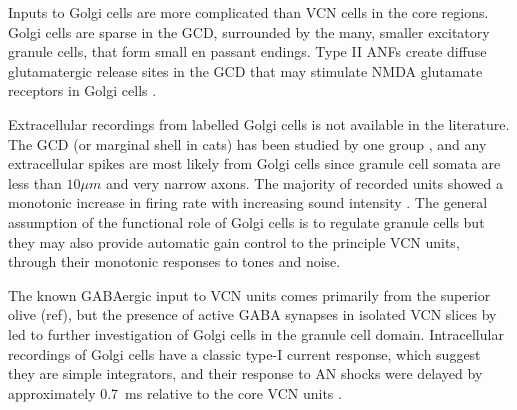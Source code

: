 


Inputs to Golgi cells are more complicated than VCN cells in the core
regions. Golgi cells are sparse in the GCD, surrounded by the many, smaller
excitatory granule cells, that form small en passant endings. Type II ANFs
create diffuse glutamatergic release sites in the GCD
\citep{HurdHutsonEtAl:1999,BensonBrown:2004} that may stimulate NMDA glutamate
receptors in Golgi cells \citep{FerragamoGoldingEtAl:1998a}.


Extracellular recordings from labelled Golgi cells is not available in the
literature.  The GCD (or marginal shell in cats) has been studied by one group
\citet{GhoshalKim:1997}, and any extracellular spikes are most likely from Golgi
cells since granule cell somata are less than $10{}\mu{m}$ and very narrow
axons. The majority of recorded units showed a monotonic increase in firing rate
with increasing sound intensity
\citep[Figure~\ref{fig:GolgiKimFig2}][]{GhoshalKim:1997}.  The general
assumption of the functional role of Golgi cells is to regulate granule cells
but they may also provide automatic gain control to the principle VCN units,
through their monotonic responses to tones and noise.


The known GABAergic input to VCN units comes primarily from the superior olive
(ref), but the presence of active GABA synapses in isolated VCN slices by
\citet{FerragamoGoldingEtAl:1998} led to further investigation of Golgi cells in
the granule cell domain. Intracellular recordings of Golgi cells have a classic
type-I current response, which suggest they are simple integrators, and their
response to AN shocks were delayed by approximately 0.7~ms relative to the core
VCN units \citep{FerragamoGoldingEtAl:1998}.


   
